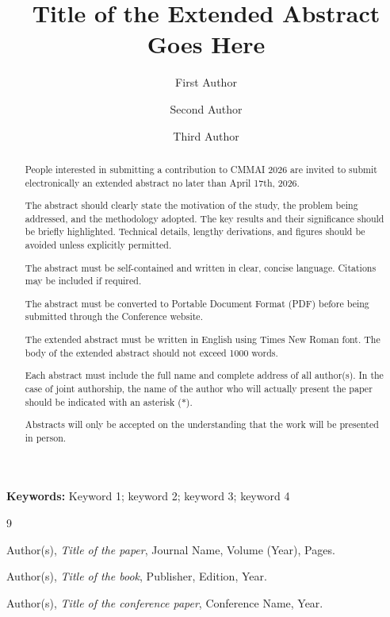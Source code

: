 \documentclass[12pt]{article}
\title{\textbf{Title of the Extended Abstract Goes Here}}
\author[1]{First Author}
\author[2]{Second Author}
\author[3]{Third Author}
\affil[1]{Department of Mathematics, University Name, City, Country}
\affil[2]{Research Scientist, Company / Industry Name, City, Country}
\affil[3]{Independent Researcher / Organisation Name, City, Country}
\date{}  %
\begin{document}
\maketitle
\thispagestyle{fancy}

\begin{abstract}
\noindent

\noindent
People interested in submitting a contribution to CMMAI 2026 are invited to submit electronically an extended abstract no later than April 17th, 2026.

\medskip

\noindent
The abstract should clearly state the motivation of the study, the problem being addressed, and the methodology adopted. The key results and their significance should be briefly highlighted. Technical details, lengthy derivations, and figures should be avoided unless explicitly permitted.
\medskip

\noindent
The abstract must be self-contained and written in clear, concise language. Citations may be included if required. 

\medskip

\noindent
The abstract must be converted to Portable Document Format (PDF) before being submitted through the Conference website.

\medskip

\noindent
The extended abstract must be written in English using Times New Roman font. The body of the extended abstract should not exceed 1000 words.

\medskip

\noindent
Each abstract must include the full name and complete address of all author(s). In the case of joint authorship, the name of the author who will actually present the paper should be indicated with an asterisk ($*$).

\medskip

\noindent
Abstracts will only be accepted on the understanding that the work will be presented in person.

\end{abstract}

\vspace{0.5em}

\textbf{Keywords:} Keyword 1; keyword 2; keyword 3; keyword 4

\vspace{1em}

\begin{thebibliography}{9}

Author(s),
\textit{Title of the paper},
Journal Name, Volume (Year), Pages.

Author(s),
\textit{Title of the book},
Publisher, Edition, Year.

Author(s),
\textit{Title of the conference paper},
Conference Name, Year.

\end{thebibliography}
\end{document}
